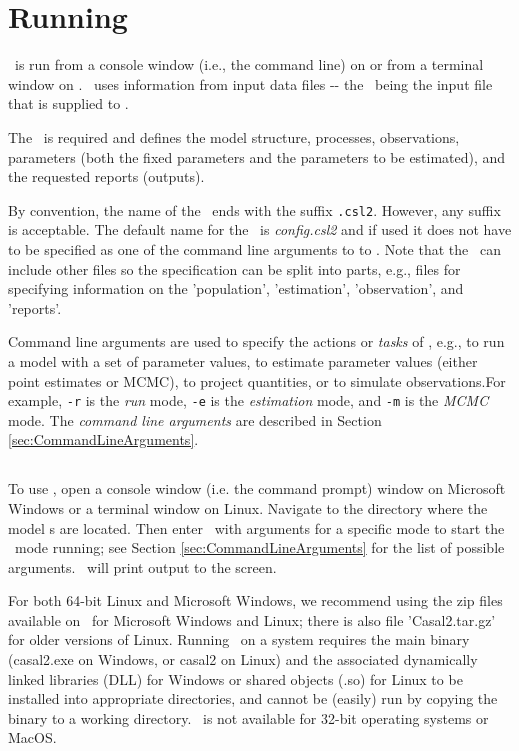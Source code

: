\section{Running \CNAME\label{sec:RunningCasal2}}

\CNAME\ is run from a console window (i.e., the command line) on  or from a terminal window on . \CNAME\ uses information from input data files -{}- the \emph{\config{}}\ being the input file that is supplied to \CNAME.

The \config\ is required and defines the model structure, processes, observations, parameters (both the fixed parameters and the parameters to be estimated), and the requested reports (outputs).

By convention, the name of the \config\ ends with the suffix \texttt{.csl2}. However, any suffix is acceptable. The default name for the \config\ is \emph{config.csl2} and if used it does not have to be specified as one of the command line arguments to to \CNAME. Note that the \config\ can include other files so the specification can be split into parts, e.g., files for specifying information on the 'population', 'estimation', 'observation', and 'reports'.

Command line arguments are used to specify the actions or \emph{tasks} of \CNAME, e.g., to run a model with a set of parameter values, to estimate parameter values (either point estimates or MCMC), to project quantities, or to simulate observations.For example, \texttt{-r} is the \emph{run} mode, \texttt{-e} is the \emph{estimation} mode, and \texttt{-m} is the \emph{MCMC} mode. The \emph{command line arguments} are described in Section \ref{sec:CommandLineArguments}.

\subsection{}

To use \CNAME, open a console window (i.e. the command prompt) window on Microsoft Windows or a terminal window on Linux. Navigate to the directory where the model \config s are located. Then enter \CNAME\ with arguments for a specific mode to start the \CNAME\ mode running; see Section \ref{sec:CommandLineArguments} for the list of possible arguments. \CNAME\ will print output to the screen.

For both 64-bit Linux and Microsoft Windows, we recommend using the zip files available on \github\ for Microsoft Windows and Linux; there is also file 'Casal2.tar.gz' for older versions of Linux. Running \CNAME\ on a system requires the main binary (casal2.exe on Windows, or casal2 on Linux) and the associated dynamically linked libraries (DLL) for Windows or shared objects (.so) for Linux to be installed into appropriate directories, and cannot be (easily) run by copying the binary to a working directory. \CNAME\ is not available for 32-bit operating systems or MacOS.

